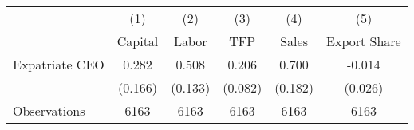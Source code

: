 \begin{tabular}{l*{5}{c}}
\hline\hline
                    &\multicolumn{1}{c}{(1)}&\multicolumn{1}{c}{(2)}&\multicolumn{1}{c}{(3)}&\multicolumn{1}{c}{(4)}&\multicolumn{1}{c}{(5)}\\
                    &\multicolumn{1}{c}{Capital}&\multicolumn{1}{c}{Labor}&\multicolumn{1}{c}{TFP}&\multicolumn{1}{c}{Sales}&\multicolumn{1}{c}{Export Share}\\
\hline
Expatriate CEO      &       0.282&       0.508&       0.206&       0.700&      -0.014\\
                    &     (0.166)&     (0.133)&     (0.082)&     (0.182)&     (0.026)\\
\hline
Observations        &        6163&        6163&        6163&        6163&        6163\\
\hline\hline
\end{tabular}
